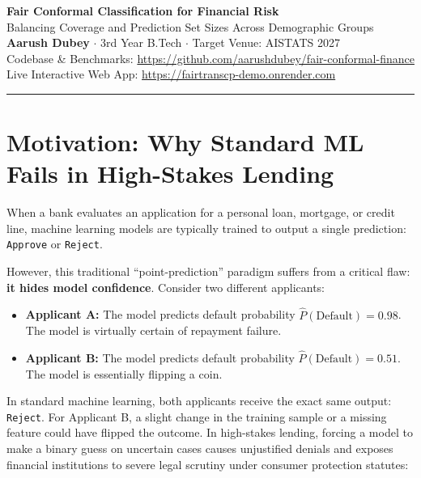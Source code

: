 \documentclass[11pt,a4paper]{article}
\begin{document}
\begin{center}
    {\LARGE\bfseries\color{navyblue} Fair Conformal Classification for Financial Risk}\\[0.3em]
    {\large Balancing Coverage and Prediction Set Sizes Across Demographic Groups}\\[0.8em]
    {\textbf{Aarush Dubey} \quad $\cdot$ \quad 3rd Year B.Tech \quad $\cdot$ \quad Target Venue: AISTATS 2027}\\[0.3em]
    {\small Codebase \& Benchmarks: \url{https://github.com/aarushdubey/fair-conformal-finance}}\\[0.2em]
    {\small Live Interactive Web App: \url{https://fairtranscp-demo.onrender.com}}
\end{center}
\vspace{0.8em}
\hrule
\vspace{1.2em}

\section{Motivation: Why Standard ML Fails in High-Stakes Lending}

When a bank evaluates an application for a personal loan, mortgage, or credit line, machine learning models are typically trained to output a single prediction: \texttt{Approve} or \texttt{Reject}. 

However, this traditional ``point-prediction'' paradigm suffers from a critical flaw: \textbf{it hides model confidence}. Consider two different applicants:
\begin{itemize}[leftmargin=1.5em, itemsep=2pt]
    \item \textbf{Applicant A:} The model predicts default probability $\hat{P}(\text{Default}) = 0.98$. The model is virtually certain of repayment failure.
    \item \textbf{Applicant B:} The model predicts default probability $\hat{P}(\text{Default}) = 0.51$. The model is essentially flipping a coin.
\end{itemize}
In standard machine learning, both applicants receive the exact same output: \texttt{Reject}. For Applicant B, a slight change in the training sample or a missing feature could have flipped the outcome. In high-stakes lending, forcing a model to make a binary guess on uncertain cases causes unjustified denials and exposes financial institutions to severe legal scrutiny under consumer protection statutes:
\end{document}
